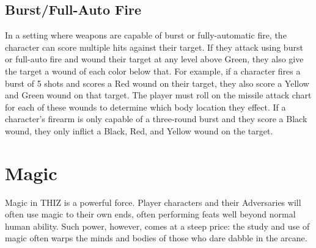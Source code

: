 \documentclass[oneside]{book}
\begin{document}
\begin{multicols}{2}
\section{Burst/Full-Auto Fire}
In a setting where weapons are capable of burst or fully-automatic fire, the character can score multiple hits against their target. If they attack using burst or full-auto fire and wound their target at any level above Green, they also give the target a wound of each color below that. For example, if a character fires a burst of 5 shots and scores a Red wound on their target, they also score a Yellow and Green wound on that target. The player must roll on the missile attack chart for each of these wounds to determine which body location they effect. If a character's firearm is only capable of a three-round burst and they score a Black wound, they only inflict a Black, Red, and Yellow wound on the target. 

\end{multicols}

\chapter{Magic}
Magic in THIZ is a powerful force. Player characters and their Adversaries will often use magic to their own ends, often performing feats well beyond normal human ability. Such power, however, comes at a steep price: the study and use of magic often warps the minds and bodies of those who dare dabble in the arcane.
\end{document}
